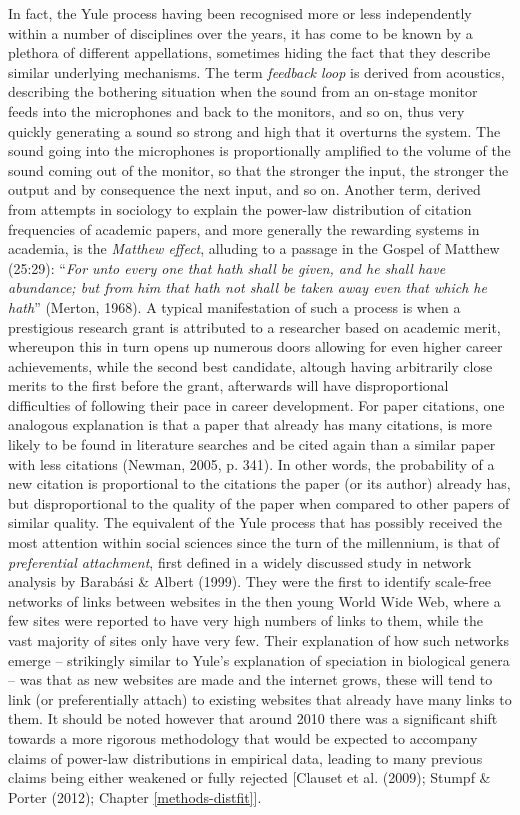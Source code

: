 \documentclass[
  12pt,
]{book}
\begin{document}
In fact, the Yule process having been recognised more or less independently within a number of disciplines over the years, it has come to be known by a plethora of different appellations, sometimes hiding the fact that they describe similar underlying mechanisms. The term \emph{feedback loop} is derived from acoustics, describing the bothering situation when the sound from an on-stage monitor feeds into the microphones and back to the monitors, and so on, thus very quickly generating a sound so strong and high that it overturns the system. The sound going into the microphones is proportionally amplified to the volume of the sound coming out of the monitor, so that the stronger the input, the stronger the output and by consequence the next input, and so on. Another term, derived from attempts in sociology to explain the power-law distribution of citation frequencies of academic papers, and more generally the rewarding systems in academia, is the \emph{Matthew effect}, alluding to a passage in the Gospel of Matthew (25:29): ``\emph{For unto every one that hath shall be given, and he shall have abundance; but from him that hath not shall be taken away even that which he hath}'' (Merton, 1968). A typical manifestation of such a process is when a prestigious research grant is attributed to a researcher based on academic merit, whereupon this in turn opens up numerous doors allowing for even higher career achievements, while the second best candidate, altough having arbitrarily close merits to the first before the grant, afterwards will have disproportional difficulties of following their pace in career development. For paper citations, one analogous explanation is that a paper that already has many citations, is more likely to be found in literature searches and be cited again than a similar paper with less citations (Newman, 2005, p. 341). In other words, the probability of a new citation is proportional to the citations the paper (or its author) already has, but disproportional to the quality of the paper when compared to other papers of similar quality. The equivalent of the Yule process that has possibly received the most attention within social sciences since the turn of the millennium, is that of \emph{preferential attachment}, first defined in a widely discussed study in network analysis by Barabási \& Albert (1999). They were the first to identify scale-free networks of links between websites in the then young World Wide Web, where a few sites were reported to have very high numbers of links to them, while the vast majority of sites only have very few. Their explanation of how such networks emerge -- strikingly similar to Yule's explanation of speciation in biological genera -- was that as new websites are made and the internet grows, these will tend to link (or preferentially attach) to existing websites that already have many links to them. It should be noted however that around 2010 there was a significant shift towards a more rigorous methodology that would be expected to accompany claims of power-law distributions in empirical data, leading to many previous claims being either weakened or fully rejected {[}Clauset et al. (2009); Stumpf \& Porter (2012); Chapter \ref{methods-distfit}{]}.
\end{document}
